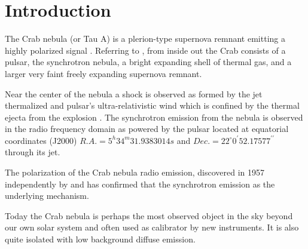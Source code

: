 \documentclass[twocolumn,traditabstract]{aa}
\begin{document}
\section{Introduction}\label{sec:introduction}
The Crab nebula (or Tau A) is a plerion-type supernova remnant emitting a highly
polarized signal \citep{1978A&A....70..419W,1991ApJ...368..463M}.
Referring to \citet{2008ARA&A..46..127H}, from inside out the Crab consists of a pulsar, the synchrotron nebula, a bright expanding shell of thermal gas, and a larger very faint freely expanding supernova remnant.

Near the center of the nebula a shock is observed as formed by the jet thermalized and pulsar's ultra-relativistic wind which is confined by the thermal ejecta from the explosion \citep{2000ApJ...536L..81W,2011A&A...528A..11W}.  
The synchrotron emission from the nebula is observed in the radio frequency domain as powered by the pulsar located at equatorial coordinates (J2000) $R.A. = 5^h34^m31.9383014s$ and $Dec. = 22^{\circ}0^{\prime}52.17577^{\prime\prime}$ \citep{Lobanov} through its jet.

The polarization of the Crab nebula radio emission, discovered in 1957 independently by \citet{1957ApJ...126..468M} and \citet{1959SvA.....3...39K} has confirmed that the synchrotron emission as the underlying mechanism. 

Today the Crab nebula is perhaps the most observed object in the sky beyond our own solar system and often used as calibrator by new instruments. It is also quite isolated
with low background diffuse emission. 
\end{document}
